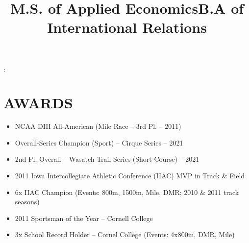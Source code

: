 \documentclass[resmargin, centered, 10pt]{../res}
\begin{document}
\begin{resume}
\title{M.S. of Applied Economics}
\begin{position}
	: 
\end{position}

\title{B.A of International Relations}
\begin{position}
\end{position}

\fullline

\section{AWARDS}

\begin{itemize}
    \item NCAA DIII All-American (Mile Race -- 3rd Pl. -- 2011)
	\item Overall-Series Champion (Sport) -- Cirque Series -- 2021
	\item 2nd Pl. Overall -- Wasatch Trail Series (Short Course) -- 2021
	\item 2011 Iowa Intercollegiate Athletic Conference (IIAC) MVP in Track \& Field
    \item 6x IIAC Champion (Events: 800m, 1500m, Mile, DMR; 2010 \& 2011 track seasons)
	\item 2011 Sportsman of the Year -- Cornell College
    \item 3x School Record Holder -- Cornel College (Events: 4x800m, DMR, Mile)
\end{itemize}

\end{resume}
\end{document}
